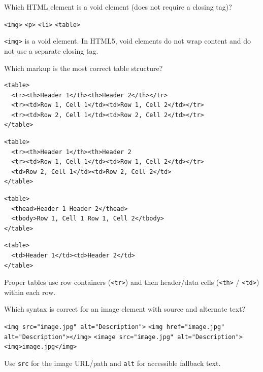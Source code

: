 \question[4]
Which HTML element is a void element (does not require a closing tag)?
\begin{choices}
  \CorrectChoice \texttt{<img>}
  \choice \texttt{<p>}
  \choice \texttt{<li>}
  \choice \texttt{<table>}
\end{choices}
\begin{solution}
  \texttt{<img>} is a void element. In HTML5, void elements do not wrap content and do not use a separate closing tag.
\end{solution}

\question[4]
Which markup is the most correct table structure?
\begin{choices}
  \CorrectChoice
\begin{lstlisting}[style=htmlinline]
<table>
  <tr><th>Header 1</th><th>Header 2</th></tr>
  <tr><td>Row 1, Cell 1</td><td>Row 1, Cell 2</td></tr>
  <tr><td>Row 2, Cell 1</td><td>Row 2, Cell 2</td></tr>
</table>
\end{lstlisting}
  \choice
\begin{lstlisting}[style=htmlinline]
<table>
  <tr><th>Header 1</th><th>Header 2
  <tr><td>Row 1, Cell 1</td><td>Row 1, Cell 2</td></tr>
  <td>Row 2, Cell 1</td><td>Row 2, Cell 2</td>
</table>
\end{lstlisting}
  \choice
\begin{lstlisting}[style=htmlinline]
<table>
  <thead>Header 1 Header 2</thead>
  <tbody>Row 1, Cell 1 Row 1, Cell 2</tbody>
</table>
\end{lstlisting}
  \choice
\begin{lstlisting}[style=htmlinline]
<table>
  <td>Header 1</td><td>Header 2</td>
</table>
\end{lstlisting}
\end{choices}
\begin{solution}
  Proper tables use row containers (\texttt{<tr>}) and then header/data cells (\texttt{<th>} / \texttt{<td>}) within each row.
\end{solution}

\question[4]
Which syntax is correct for an image element with source and alternate text?
\begin{choices}
  \CorrectChoice \texttt{<img src="image.jpg" alt="Description">}
  \choice \texttt{<img href="image.jpg" alt="Description"></img>}
  \choice \texttt{<image src="image.jpg" alt="Description">}
  \choice \texttt{<img>image.jpg</img>}
\end{choices}
\begin{solution}
  Use \texttt{src} for the image URL/path and \texttt{alt} for accessible fallback text.
\end{solution}

